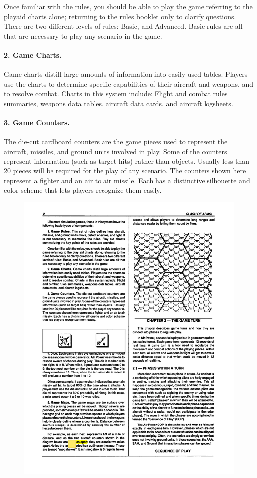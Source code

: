 Once familiar with the rules, you should be able to play the game referring to the play{\xhyphen}aid charts alone; returning to the rules booklet only to clarify questions. There are two different levels of rules: Basic, and Advanced. Basic rules are all that are necessary to play any scenario in the game.

\paragraph{2. Game Charts.} Game charts distill large amounts of information into easily used tables. Players use the charts to determine specific capabilities of their aircraft and weapons, and to resolve combat. Charts in this system include: Flight and combat rules summaries, weapons data tables, aircraft data cards, and aircraft logsheets.

\paragraph{3. Game Counters.} The die-cut cardboard counters are the game pieces used to represent the aircraft, missiles, and ground units involved in play. Some of the counters represent information (such as target hits) rather than objects. Usually less than 20 pieces will be required for the play of any scenario. The counters shown here represent a fighter and an air to air missile. Each has a distinctive silhouette and color scheme that lets players recognize them easily.

\begin{figure}[h!]
\centering
\includegraphics[width=\linewidth]{figures/figure-A.pdf}
\end{figure}

